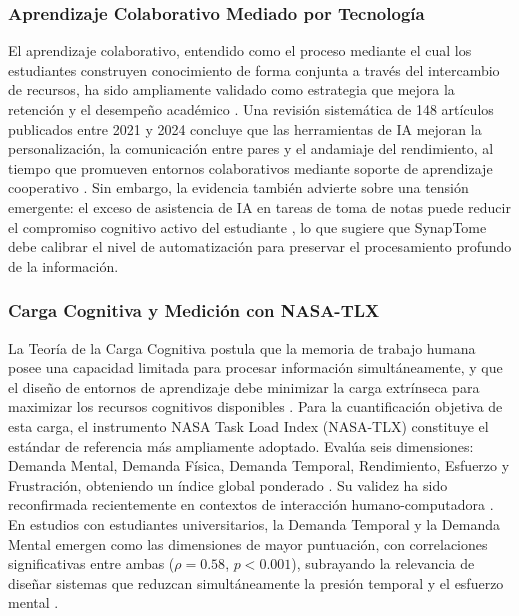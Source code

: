 \subsubsection{Aprendizaje Colaborativo Mediado por Tecnología}

El aprendizaje colaborativo, entendido como el proceso mediante el cual los estudiantes 
construyen conocimiento de forma conjunta a través del intercambio de recursos, ha sido 
ampliamente validado como estrategia que mejora la retención y el desempeño académico 
\parencite{Kasirye2023}. Una revisión sistemática de 148 artículos publicados entre 
2021 y 2024 concluye que las herramientas de IA mejoran la personalización, la 
comunicación entre pares y el andamiaje del rendimiento, al tiempo que promueven 
entornos colaborativos mediante soporte de aprendizaje cooperativo 
\parencite{MsambwaAI2025}. Sin embargo, la evidencia también advierte sobre una tensión 
emergente: el exceso de asistencia de IA en tareas de toma de notas puede reducir el 
compromiso cognitivo activo del estudiante \parencite{AINoteTakingCognition2025}, lo 
que sugiere que SynapTome debe calibrar el nivel de automatización para preservar el 
procesamiento profundo de la información.

\subsubsection{Carga Cognitiva y Medición con NASA-TLX}

La Teoría de la Carga Cognitiva postula que la memoria de trabajo humana posee una 
capacidad limitada para procesar información simultáneamente, y que el diseño de 
entornos de aprendizaje debe minimizar la carga extrínseca para maximizar los recursos 
cognitivos disponibles \parencite{HartStaveland1988}. Para la cuantificación objetiva 
de esta carga, el instrumento NASA Task Load Index (NASA-TLX) constituye el estándar 
de referencia más ampliamente adoptado. Evalúa seis dimensiones: Demanda Mental, 
Demanda Física, Demanda Temporal, Rendimiento, Esfuerzo y Frustración, obteniendo 
un índice global ponderado \parencite{HartStaveland1988}. Su validez ha sido 
reconfirmada recientemente en contextos de interacción humano-computadora 
\parencite{NASATLXReviewHCI2025}. En estudios con estudiantes universitarios, la 
Demanda Temporal y la Demanda Mental emergen como las dimensiones de mayor puntuación, 
con correlaciones significativas entre ambas ($\rho = 0.58$, $p < 0.001$), subrayando 
la relevancia de diseñar sistemas que reduzcan simultáneamente la presión temporal y 
el esfuerzo mental \parencite{Cahyadi2026}.

